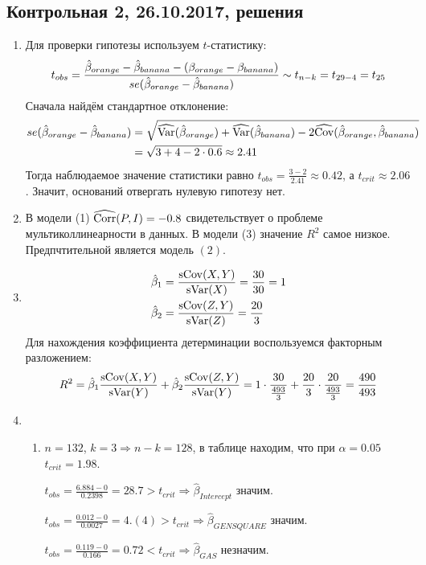 \subsection{Контрольная 2, 26.10.2017, решения}

\begin{enumerate}
\item Для проверки гипотезы используем $t$-статистику:
\[
t_{obs} = \frac{\hat{\beta}_{orange} - \hat{\beta}_{banana} - (\beta_{orange} - \beta_{banana})}{se(\hat{\beta}_{orange} - \hat{\beta}_{banana})} \sim t_{n-k} = t_{29 -4} = t_{25}
\]
Сначала найдём стандартное отклонение:
\begin{align*}
se(\hat{\beta}_{orange} - \hat{\beta}_{banana}) &= \sqrt{\widehat{\operatorname{Var}}(\hat{\beta}_{orange}) + \widehat{\operatorname{Var}}(\hat{\beta}_{banana}) - 2 \widehat{\operatorname{Cov}}(\hat{\beta}_{orange}, \hat{\beta}_{banana})} \\
&= \sqrt{3 + 4 - 2\cdot 0.6} \approx 2.41
\end{align*}
Тогда наблюдаемое значение статистики равно $t_{obs} = \frac{3-2}{2.41} \approx 0.42$,
а $t_{crit} \approx 2.06$. Значит, оснований отвергать нулевую гипотезу нет.
\item В модели (1) $\widehat{\operatorname{Corr}}(P,I)=-0.8$ свидетельствует о проблеме мультиколлинеарности в данных.
В модели (3) значение $R^2$ самое низкое. Предпчтительной является модель $(2)$.
\item
\begin{align*}
\hat \beta_1 &= \frac{\operatorname{sCov}(X,Y)}{\operatorname{sVar}(X)} = \frac{30}{30} = 1 \\
\hat \beta_2 &= \frac{\operatorname{sCov}(Z,Y)}{\operatorname{sVar}(Z)} = \frac{20}{3}
\end{align*}
Для нахождения коэффициента детерминации воспользуемся факторным разложением:
\[
R^2 = \hat{\beta}_1 \frac{\operatorname{sCov}(X,Y)}{\operatorname{sVar}(Y)} + \hat{\beta}_2 \frac{\operatorname{sCov}(Z,Y)}{\operatorname{sVar}(Y)} = 1 \cdot \frac{30}{\frac{493}{3}} + \frac{20}{3} \cdot \frac{20}{\frac{493}{3}} = \frac{490}{493}
\]
\item
\begin{enumerate}
\item $n=132$, $k=3 \Rightarrow n-k = 128$, в таблице находим,
что при $\alpha = 0.05$ $t_{crit} = 1.98$.

$t_{obs} = \frac{6.884 - 0}{0.2398} = 28.7 > t_{crit} \Rightarrow \hat \beta_{Intercept}$ значим.

$t_{obs} = \frac{0.012 - 0}{0.0027} = 4.(4) > t_{crit} \Rightarrow \hat \beta_{GENSQUARE}$ значим.

$t_{obs} = \frac{0.119 - 0}{0.166} = 0.72 < t_{crit} \Rightarrow \hat \beta_{GAS}$ незначим.


\end{enumerate}
\end{enumerate}

